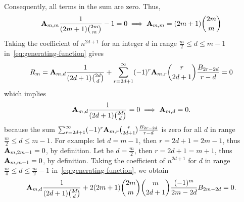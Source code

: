Consequently, all terms in the sum are zero.
Thus,
\begin{align*}
    {\mathbf{A}} \sb{m,m} \frac{1}{(2m+1) \binom{2m}{m}}  - 1 = 0 \implies {\mathbf{A}} \sb{m,m} = (2m+1) \binom{2m}{m}
\end{align*}
Taking the coefficient of $n^{2d+1}$ for an integer $d$ in range $\frac{m}{2} \leq d \leq m-1$
in~\eqref{eq:generating-function} gives
\begin{align*}
[n^{2d+1}]
    R_m
    = \coeffA{m}{d} \frac{1}{(2d+1) \binom{2d}{d}}
    + \sum_{r=2d+1}^{\infty} (-1)^r \coeffA{m}{r} \binom{r}{2d+1} \frac{\bernoulli{2r-2d} }{r-d}
    = 0
\end{align*}
which implies
\begin{align*}
    {\mathbf{A}} \sb{m,d} \frac{1}{(2d+1) \binom{2d}{d}} = 0 \implies {\mathbf{A}} \sb{m,d} = 0.
\end{align*}
because the sum $\sum_{r=2d+1}^{\infty} (-1)^r {\mathbf{A}} \sb{m,r} \binom{r}{2d+1} \frac{{B}\sb{2r-2d} }{r-d}$ is zero
for all $d$ in range $\frac{m}{2} \leq d \leq m-1$.
For example: let $d=m-1$, then $r= 2d+1 = 2m-1$, thus ${\mathbf{A}} \sb{m,2m-1}=0$, by definition.
Let be $d=\frac{m}{2}$, then $r=2d+1 = m+1$, thus ${\mathbf{A}} \sb{m,m+1}=0$, by definition.
Taking the coefficient of $n^{2d+1}$ for $d$ in range $\frac{m}{4} \leq d \leq \frac{m}{2}-1$ in~\eqref{eq:generating-function}, we obtain
\begin{align*}
    {\mathbf{A}} \sb{m,d} \frac{1}{(2d+1) \binom{2d}{d}}
    + 2 (2m+1) \binom{2m}{m} \binom{m}{2d+1} \frac{(-1)^m}{2m - 2d} {B}\sb{2m - 2d} = 0.
\end{align*}
